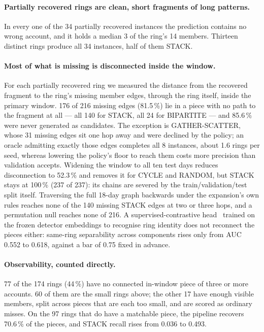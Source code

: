 \paragraph{Partially recovered rings are clean, short fragments of long patterns.}
In every one of the 34 partially recovered instances the prediction contains no wrong
account, and it holds a median 3 of the ring's 14 members. Thirteen distinct rings produce all
34 instances, half of them STACK.

\paragraph{Most of what is missing is disconnected inside the window.}
For each partially recovered ring we measured the distance from the recovered fragment to the
ring's missing member edges, through the ring itself, inside the primary window. 176 of 216
missing edges (81.5\,\%) lie in a piece with no path to the fragment at all --- all 140 for
STACK, all 24 for BIPARTITE --- and 85.6\,\% were never generated as candidates. The exception
is GATHER-SCATTER, whose 31 missing edges sit one hop away and were declined by the policy; an
oracle admitting exactly those edges completes all 8 instances, about 1.6 rings per seed,
whereas lowering the policy's floor to reach them costs more precision than validation
accepts.
Widening the window to all ten test days reduces disconnection to 52.3\,\% and removes it for
CYCLE and RANDOM, but STACK stays at 100\,\% (237 of 237): its chains are severed by the
train/validation/test split itself. Traversing the full 18-day graph backwards under the
expansion's own rules reaches none of the 140 missing STACK edges at two or three hops, and a
permutation null reaches none of 216.
A supervised-contrastive head~\citep{khosla2020} trained on the frozen detector embeddings to
recognise ring identity does not reconnect the pieces either: same-ring separability across
components rises only from AUC 0.552 to 0.618, against a bar of 0.75 fixed in advance.

\paragraph{Observability, counted directly.}
77 of the 174 rings (44\,\%) have no connected in-window piece of three or more accounts. 60
of them are the small rings above; the other 17 have enough visible members, split across
pieces that are each too small, and are scored as ordinary misses. On the 97 rings that do
have a matchable piece, the pipeline recovers 70.6\,\% of the pieces, and STACK recall rises
from 0.036 to 0.493.

